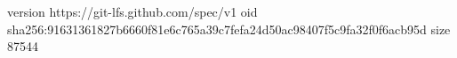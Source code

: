 version https://git-lfs.github.com/spec/v1
oid sha256:91631361827b6660f81e6c765a39c7fefa24d50ac98407f5c9fa32f0f6acb95d
size 87544
